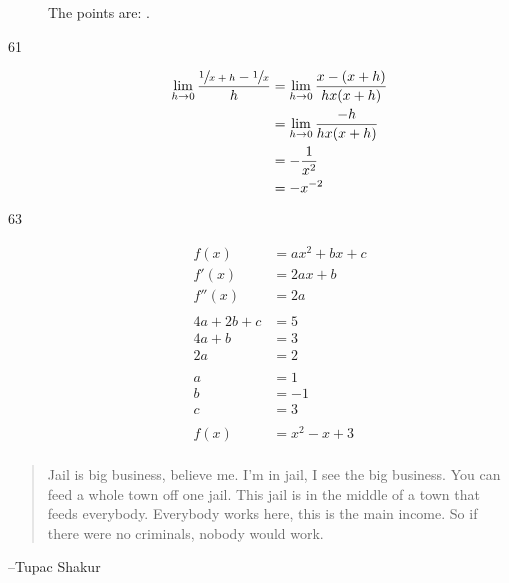 \documentclass[letterpaper, landscape]{exam}
\begin{document}
\begin{description}
      The points are: .

    \item[61]
      \begin{align*}
        \lim_{h \to 0} \frac{\sfrac{1}{x + h} - \sfrac{1}{x}}{h} & = \lim_{h \to 0} \frac{x - (x + h)}{hx(x + h)} \\
                                                                 & = \lim_{h \to 0} \frac{-h}{hx(x + h)} \\
                                                                 & = - \frac{1}{x^2} \\
                                                                 &= - x^{-2} \\
      \end{align*}

    \item[63]
      \begin{align*}
        f(x)        & = ax^2 + bx + c \\
        f'(x)       & = 2ax + b \\
        f''(x)      & = 2a \\
        \\
        4a + 2b + c & = 5 \\
        4a + b      & = 3 \\
        2a          & = 2 \\
        \\
        a           & = 1 \\
        b           & = -1 \\
        c           & = 3 \\
        \\
        f(x)        & = \boxed{ x^2 - x + 3 } \\
      \end{align*}
   \end{description}
 
  \else
    \vspace{10 cm}
    \begin{quote}
      \begin{em}
        Jail is big business, believe me. I'm in jail, I see the big business.
        You can feed a whole town off one jail. This jail is in the middle of a
        town that feeds everybody. Everybody works here, this is the main
        income. So if there were no criminals, nobody would work.
      \end{em}
    \end{quote}
    \hspace{2 cm} --Tupac Shakur
  \fi
\end{document}
